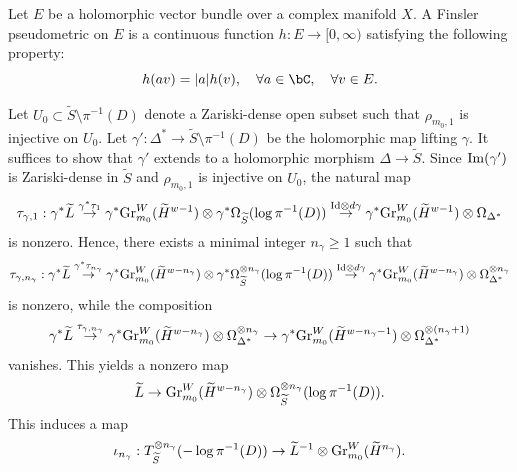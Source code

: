 \documentclass[11pt,letterpaper]{amsart}
\numberwithin{equation}{section}
\begin{document}
	\subsubsection{}
	\begin{defn}  
		Let $E$ be a holomorphic vector bundle over a complex manifold $X$. A Finsler pseudometric on $E$ is a continuous function $h: E \to [0, \infty)$ satisfying the following property:  
		$$  
		h(av) = |a| h(v), \quad \forall a \in \bC, \quad \forall v \in E.  
		$$   
	\end{defn} 
	Let $U_0 \subset \widetilde{S} \setminus \pi^{-1}(D)$ denote a Zariski-dense open subset such that $\rho_{m_0,1}$ is injective on $U_0$. Let $\gamma': \Delta^\ast \to \widetilde{S} \setminus \pi^{-1}(D)$ be the holomorphic map lifting $\gamma$. It suffices to show that $\gamma'$ extends to a holomorphic morphism $\Delta \to \widetilde{S}$. Since ${\rm Im}(\gamma')$ is Zariski-dense in $\widetilde{S}$ and $\rho_{m_0,1}$ is injective on $U_0$, the natural map  
	$$  
	\tau_{\gamma,1}: \gamma^\ast \widetilde{L} \stackrel{\gamma^\ast \tau_1}{\to} \gamma^\ast {\rm Gr}^W_{m_0}(\widetilde{H}^{w-1}) \otimes \gamma^\ast \Omega_{\widetilde{S}}(\log \pi^{-1}(D)) \stackrel{{\rm Id} \otimes d\gamma}{\to} \gamma^\ast {\rm Gr}^W_{m_0}(\widetilde{H}^{w-1}) \otimes \Omega_{\Delta^\ast}  
	$$  
	is nonzero. Hence, there exists a minimal integer $n_\gamma \geq 1$ such that  
	$$  
	\tau_{\gamma,n_\gamma}: \gamma^\ast \widetilde{L} \stackrel{\gamma^\ast \tau_{n_\gamma}}{\to} \gamma^\ast {\rm Gr}^W_{m_0}(\widetilde{H}^{w-n_\gamma}) \otimes \gamma^\ast \Omega^{\otimes n_\gamma}_{\widetilde{S}}(\log \pi^{-1}(D)) \stackrel{{\rm Id} \otimes d\gamma}{\to} \gamma^\ast {\rm Gr}^W_{m_0}(\widetilde{H}^{w-n_\gamma}) \otimes \Omega^{\otimes n_\gamma}_{\Delta^\ast}  
	$$  
	is nonzero, while the composition  
	$$  
	\gamma^\ast \widetilde{L} \stackrel{\tau_{\gamma,n_\gamma}}{\to} \gamma^\ast {\rm Gr}^W_{m_0}(\widetilde{H}^{w-n_\gamma}) \otimes \Omega^{\otimes n_\gamma}_{\Delta^\ast} \to \gamma^\ast {\rm Gr}^W_{m_0}(\widetilde{H}^{w-n_\gamma-1}) \otimes \Omega^{\otimes (n_\gamma+1)}_{\Delta^\ast}  
	$$  
	vanishes. This yields a nonzero map  
	$$  
	\widetilde{L} \to {\rm Gr}^W_{m_0}(\widetilde{H}^{w-n_\gamma}) \otimes \Omega^{\otimes n_\gamma}_{\widetilde{S}}(\log \pi^{-1}(D)).  
	$$  
	This induces a map  
	\begin{align}  
		\iota_{n_\gamma}: T^{\otimes n_\gamma}_{\widetilde{S}}(-\log \pi^{-1}(D)) \to \widetilde{L}^{-1} \otimes {\rm Gr}^W_{m_0}(\widetilde{H}^{n_\gamma}).  
	\end{align}  
\end{document}
